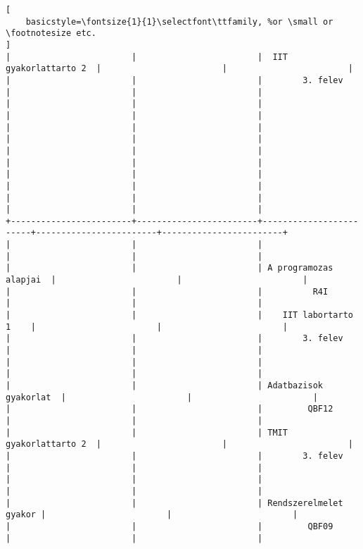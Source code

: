 \begin{lstlisting}[
    basicstyle=\fontsize{1}{1}\selectfont\ttfamily, %or \small or \footnotesize etc.
]
|                        |                        |  IIT gyakorlattarto 2  |                        |                        | 
|                        |                        |        3. felev        |                        |                        | 
|                        |                        |                        |                        |                        | 
|                        |                        |                        |                        |                        | 
|                        |                        |                        |                        |                        | 
|                        |                        |                        |                        |                        | 
|                        |                        |                        |                        |                        | 
+------------------------+------------------------+------------------------+------------------------+------------------------+
|                        |                        |                        |                        |                        | 
|                        |                        | A programozas alapjai  |                        |                        | 
|                        |                        |          R4I           |                        |                        | 
|                        |                        |    IIT labortarto 1    |                        |                        | 
|                        |                        |        3. felev        |                        |                        | 
|                        |                        |                        |                        |                        | 
|                        |                        | Adatbazisok gyakorlat  |                        |                        | 
|                        |                        |         QBF12          |                        |                        | 
|                        |                        | TMIT gyakorlattarto 2  |                        |                        | 
|                        |                        |        3. felev        |                        |                        | 
|                        |                        |                        |                        |                        | 
|                        |                        | Rendszerelmelet gyakor |                        |                        | 
|                        |                        |         QBF09          |                        |                        | 

\end{lstlisting}
